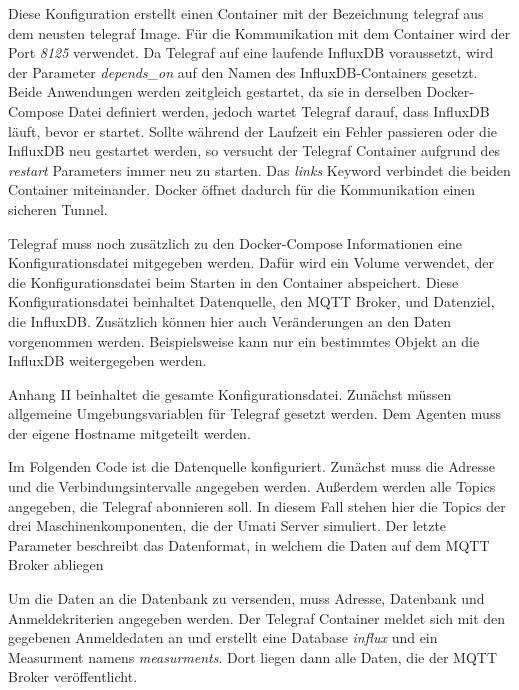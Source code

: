 \documentclass[a4paper, 12pt, oneside, toc=listofnumbered, bibliography=totoc]{scrbook}
\begin{document}
			
			
			Diese Konfiguration erstellt einen Container mit der Bezeichnung telegraf aus dem neusten telegraf Image. Für die Kommunikation mit dem Container wird der Port \textit{8125} verwendet. Da Telegraf auf eine laufende InfluxDB voraussetzt, wird der Parameter \textit{depends\_on} auf den Namen des InfluxDB-Containers gesetzt. Beide Anwendungen werden zeitgleich gestartet, da sie in derselben Docker-Compose Datei definiert werden, jedoch wartet Telegraf darauf, dass InfluxDB läuft, bevor er startet. Sollte während der Laufzeit ein Fehler passieren oder die InfluxDB neu gestartet werden, so versucht der Telegraf Container aufgrund des \textit{restart} Parameters immer neu zu starten. Das \textit{links} Keyword verbindet die beiden Container miteinander. Docker öffnet dadurch für die Kommunikation einen sicheren Tunnel.
			
			Telegraf muss noch zusätzlich zu den Docker-Compose Informationen eine Konfigurationsdatei mitgegeben werden. Dafür wird ein Volume verwendet, der die Konfigurationsdatei beim Starten in den Container abspeichert. Diese Konfigurationsdatei beinhaltet Datenquelle, den MQTT Broker, und Datenziel, die InfluxDB. Zusätzlich können hier auch Veränderungen an den Daten vorgenommen werden. Beispielsweise kann nur ein bestimmtes Objekt an die InfluxDB weitergegeben werden. 
			
			Anhang II beinhaltet die gesamte Konfigurationsdatei. Zunächst müssen allgemeine Umgebungsvariablen für Telegraf gesetzt werden. Dem Agenten muss der eigene Hostname mitgeteilt werden. 
			
			
			
			Im Folgenden Code ist die Datenquelle konfiguriert. Zunächst muss die Adresse und die Verbindungsintervalle angegeben werden. Außerdem werden alle Topics angegeben, die Telegraf abonnieren soll. In diesem Fall stehen hier die Topics der drei Maschinenkomponenten, die der Umati Server simuliert. Der letzte Parameter beschreibt das Datenformat, in welchem die Daten auf dem MQTT Broker abliegen
			
			
			
			Um die Daten an die Datenbank zu versenden, muss Adresse, Datenbank und Anmeldekriterien angegeben werden. Der Telegraf Container meldet sich mit den gegebenen Anmeldedaten an und erstellt eine Database \textit{influx} und ein Measurment namens \textit{measurments}. Dort liegen dann alle Daten, die der MQTT Broker veröffentlicht. 
			
\end{document}
